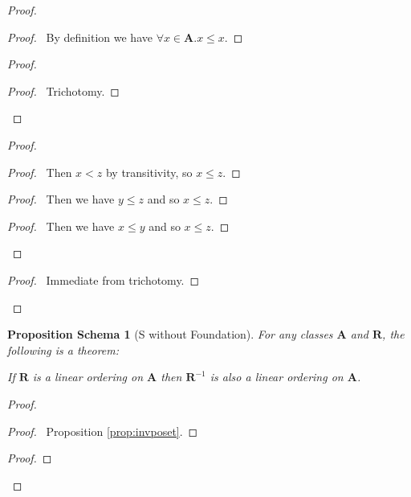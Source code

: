 \documentclass{book}
\let\qed\relax
\newtheorem{props}[ax]{Proposition Schema}
\theoremstyle{definition}
\begin{document}
\begin{proof}
\pf
{}
\begin{proof}
	\pf\ By definition we have $\forall x \in \mathbf{A}. x \leq x$.
\end{proof}
\begin{proof}
	\begin{proof}
		\pf\ Trichotomy.
	\end{proof}
\end{proof}
\begin{proof}
	\begin{proof}
		\pf\ Then $x < z$ by transitivity, so $x \leq z$.
	\end{proof}
	\begin{proof}
		\pf\ Then we have $y \leq z$ and so $x \leq z$.
	\end{proof}
	\begin{proof}
		\pf\ Then we have $x \leq y$ and so $x \leq z$.
	\end{proof}
\end{proof}
\begin{proof}
	\pf\ Immediate from trichotomy.
\end{proof}
\qed
\end{proof}

\begin{props}[S without Foundation]
For any classes $\mathbf{A}$ and $\mathbf{R}$, the following is a theorem:

If $\mathbf{R}$ is a linear ordering on $\mathbf{A}$ then $\mathbf{R}^{-1}$ is also a linear ordering on $\mathbf{A}$.
\end{props}

\begin{proof}
\pf
{}
\begin{proof}
	\pf\ Proposition \ref{prop:invposet}.
\end{proof}
\begin{proof}
\end{proof}
\qed
\end{proof}
\end{document}
